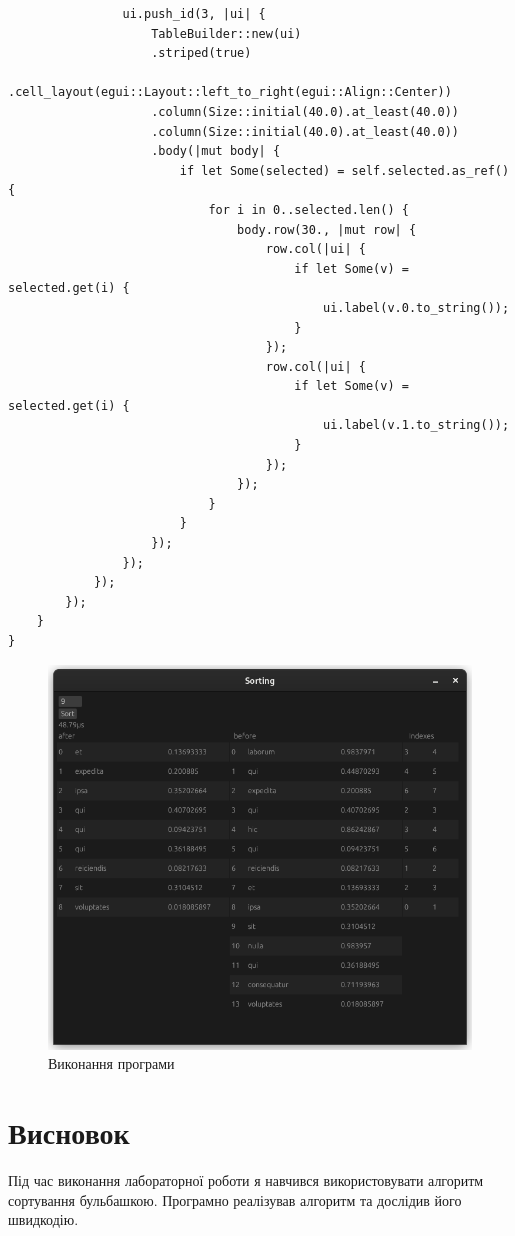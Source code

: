 \documentclass{article}
\begin{document}
\begin{normalsize}
\begin{lstlisting}
				ui.push_id(3, |ui| {
					TableBuilder::new(ui)
					.striped(true)
					.cell_layout(egui::Layout::left_to_right(egui::Align::Center))
					.column(Size::initial(40.0).at_least(40.0))
					.column(Size::initial(40.0).at_least(40.0))
					.body(|mut body| {
						if let Some(selected) = self.selected.as_ref() {
							for i in 0..selected.len() {
								body.row(30., |mut row| {
									row.col(|ui| {
										if let Some(v) = selected.get(i) {
											ui.label(v.0.to_string());
										}
									});
									row.col(|ui| {
										if let Some(v) = selected.get(i) {
											ui.label(v.1.to_string());
										}
									});
								});
							}
						}
					});
				});
			});
		});
	}
}\end{lstlisting}

	\begin{figure}[H]
		\centering
		\includegraphics[scale=0.7]{1}
		\caption{Виконання програми}
	\end{figure}
	
	\section*{Висновок}
	Під час виконання лабораторної роботи я навчився використовувати алгоритм сортування бульбашкою. Програмно реалізував алгоритм та дослідив його швидкодію.
	    
\end{normalsize}
\end{document}
